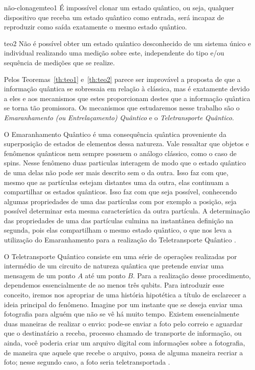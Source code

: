 \documentclass[11pt,oneside,brazil,hidelinks,article,sumario=tradicional,a4paper]{abntex2}
\begin{document}
\begin{theo}{não-clonagem}{teo1}
É impossível clonar um estado quântico, ou seja, qualquer dispositivo que receba um estado quântico como entrada, será incapaz de reproduzir como saída exatamente o mesmo estado quântico.
\end{theo}

\begin{theo}{}{teo2}
Não é possível obter um estado quântico desconhecido de um sistema único e individual realizando uma medição sobre este, independente do tipo e/ou sequência de medições que se realize.
\end{theo}

Pelos Teoremas~\ref{th:teo1} e~\ref{th:teo2} parece ser improvável a proposta de que a informação quântica se sobressaia em relação à clássica, mas é exatamente devido a eles e aos mecanismos que estes proporcionam destes que a informação quântica se torna tão promissora. Os mecanismos que estudaremos nesse trabalho são o \textit{Emaranhamento (ou Entrelaçamento) Quântico} e o \textit{Teletransporte Quântico}.

O Emaranhamento Quântico é uma consequência quântica proveniente da superposição de estados de elementos dessa natureza. Vale ressaltar que objetos e fenômenos quânticos nem sempre possuem o análogo clássico, como o caso de spins. Nesse fenômeno duas particulas interagem de modo que o estado quântico de uma delas não pode ser mais descrito sem o da outra. Isso faz com que, mesmo que as partículas estejam distantes uma da outra, elas continuam a compartilhar os estados quânticos. Isso faz com que seja possível, conhecendo algumas propriedades de uma das partículas com por exemplo a posição, seja possível determinar esta mesma característica da outra partícula. A determinação das propriedades de uma das partículas culmina na instantânea definição na segunda, pois elas compartilham o mesmo estado quântico, o que nos leva a utilização do Emaranhamento para a realização do Teletransporte Quântico \cites{materialdidaticomecquantica}{fonzar}{TeoQuanInfoEntreCopia}.

O Teletransporte Quântico consiste em uma série de operações realizadas por intermédio de um circuito de natureza quântica que pretende enviar uma mensagem de um ponto \(A\) até um ponto \(B\). Para a realização desse procedimento, dependemos essencialmente de ao menos três qubits. Para introduzir esse conceito, iremos nos apropriar de uma história hipotética a título de esclarecer a ideia principal do fenômeno. Imagine por um instante que se deseja enviar uma fotografia para alguém que não se vê há muito tempo. Existem essencialmente duas maneiras de realizar o envio: pode-se enviar a foto pelo correio e aguardar que o destinatário a receba, processo chamado de transporte de informação, ou ainda, você poderia criar um arquivo digital com informações sobre a fotografia, de maneira que aquele que recebe o arquivo, possa de alguma maneira recriar a foto; nesse segundo caso, a foto seria teletransportada \cite{materialdidaticomecquantica}.
\end{document}
